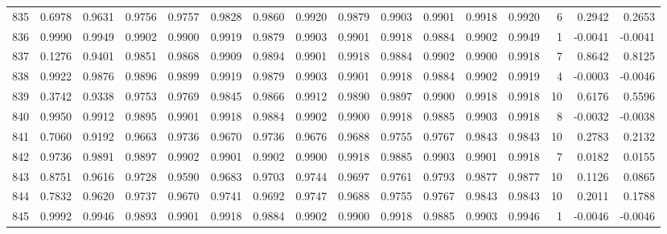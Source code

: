 \begin{tabular}{lrrrrrrrrrrrrrrr}
835 &      0.6978 &  0.9631 &  0.9756 &  0.9757 &  0.9828 &  0.9860 &  0.9920 &  0.9879 &  0.9903 &  0.9901 &   0.9918 &     0.9920 &      6 &                    0.2942 &                     0.2653 \\
836 &      0.9990 &  0.9949 &  0.9902 &  0.9900 &  0.9919 &  0.9879 &  0.9903 &  0.9901 &  0.9918 &  0.9884 &   0.9902 &     0.9949 &      1 &                   -0.0041 &                    -0.0041 \\
837 &      0.1276 &  0.9401 &  0.9851 &  0.9868 &  0.9909 &  0.9894 &  0.9901 &  0.9918 &  0.9884 &  0.9902 &   0.9900 &     0.9918 &      7 &                    0.8642 &                     0.8125 \\
838 &      0.9922 &  0.9876 &  0.9896 &  0.9899 &  0.9919 &  0.9879 &  0.9903 &  0.9901 &  0.9918 &  0.9884 &   0.9902 &     0.9919 &      4 &                   -0.0003 &                    -0.0046 \\
839 &      0.3742 &  0.9338 &  0.9753 &  0.9769 &  0.9845 &  0.9866 &  0.9912 &  0.9890 &  0.9897 &  0.9900 &   0.9918 &     0.9918 &     10 &                    0.6176 &                     0.5596 \\
840 &      0.9950 &  0.9912 &  0.9895 &  0.9901 &  0.9918 &  0.9884 &  0.9902 &  0.9900 &  0.9918 &  0.9885 &   0.9903 &     0.9918 &      8 &                   -0.0032 &                    -0.0038 \\
841 &      0.7060 &  0.9192 &  0.9663 &  0.9736 &  0.9670 &  0.9736 &  0.9676 &  0.9688 &  0.9755 &  0.9767 &   0.9843 &     0.9843 &     10 &                    0.2783 &                     0.2132 \\
842 &      0.9736 &  0.9891 &  0.9897 &  0.9902 &  0.9901 &  0.9902 &  0.9900 &  0.9918 &  0.9885 &  0.9903 &   0.9901 &     0.9918 &      7 &                    0.0182 &                     0.0155 \\
843 &      0.8751 &  0.9616 &  0.9728 &  0.9590 &  0.9683 &  0.9703 &  0.9744 &  0.9697 &  0.9761 &  0.9793 &   0.9877 &     0.9877 &     10 &                    0.1126 &                     0.0865 \\
844 &      0.7832 &  0.9620 &  0.9737 &  0.9670 &  0.9741 &  0.9692 &  0.9747 &  0.9688 &  0.9755 &  0.9767 &   0.9843 &     0.9843 &     10 &                    0.2011 &                     0.1788 \\
845 &      0.9992 &  0.9946 &  0.9893 &  0.9901 &  0.9918 &  0.9884 &  0.9902 &  0.9900 &  0.9918 &  0.9885 &   0.9903 &     0.9946 &      1 &                   -0.0046 &                    -0.0046 \\

\end{tabular}
